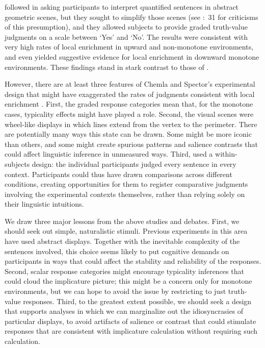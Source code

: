 \documentclass[leqno,12pt]{article}
\newcommand{\pgcitealt}[2]{\citealt{#1}:~#2}
\begin{document}
{\citet{Chemla:Spector:2011} followed \citet{Geurts:Pouscoulous:2009}
in asking participants to interpret quantified sentences in abstract
geometric scenes, but they sought to simplify those scenes (see
\pgcitealt{geurts-vantiel:2013:scalar}{31} for criticisms of this
presumption), and they allowed subjects to provide graded truth-value
judgments on a scale between `Yes' and `No'. The results were
consistent with very high rates of local enrichment in upward and
non-monotone environments, and even yielded suggestive evidence for
local enrichment in downward monotone environments. These findings
stand in stark contrast to those of \citet{Geurts:Pouscoulous:2009}.

However, there are at least three features of Chemla and Spector's
experimental design that might have exaggerated the rates of judgments
consistent with local enrichment
\citep{geurts-vantiel:2013:scalar}. First, the graded response
categories mean that, for the monotone cases, typicality effects might
have played a role. Second, the visual scenes were wheel-like displays
in which lines extend from the vertex to the perimeter. There are
potentially many ways this state can be drawn.  Some might be more
iconic than others, and some might create spurious patterns and
salience contrasts that could affect linguistic inference in
unmeasured ways. Third, \citeauthor{Chemla:Spector:2011} used a
within-subjects design: the individual participants judged every
sentence in every context. Participants could thus have drawn
comparisons across different conditions, creating opportunities for
them to register comparative judgments involving the experimental
contexts themselves, rather than relying solely on their linguistic
intuitions.

We draw three major lessons from the above studies and debates. First,
we should seek out simple, naturalistic stimuli. Previous experiments
in this area have used abstract displays. Together with the inevitable
complexity of the sentences involved, this choice seems likely to put
cognitive demands on participants in ways that could affect the
stability and reliability of the responses. Second, scalar response
categories might encourage typicality inferences that could cloud the
implicature picture; this might be a concern only for monotone
environments, but we can hope to avoid the issue by restricting to
just truth-value responses. Third, to the greatest extent possible, we
should seek a design that supports analyses in which we can
marginalize out the idiosyncrasies of particular displays, to avoid
artifacts of salience or contrast that could stimulate responses that
are consistent with implicature calculation without requiring such
calculation.



}
\end{document}

